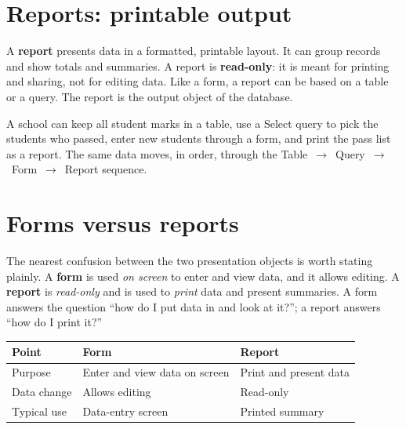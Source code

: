\section{Reports: printable output}
A \textbf{report} presents data in a formatted, printable layout. It can
group records and show totals and summaries. A report is \textbf{read-only}:
it is meant for printing and sharing, not for editing data. Like a form, a
report can be based on a table or a query. The report is the output object of
the database.

\begin{example}
A school can keep all student marks in a table, use a Select query to pick
the students who passed, enter new students through a form, and print the
pass list as a report. The same data moves, in order, through the
Table~$\rightarrow$~Query~$\rightarrow$~Form~$\rightarrow$~Report sequence.
\end{example}

\section{Forms versus reports}
The nearest confusion between the two presentation objects is worth stating
plainly. A \textbf{form} is used \emph{on screen} to enter and view data, and
it allows editing. A \textbf{report} is \emph{read-only} and is used to
\emph{print} data and present summaries. A form answers the question ``how do
I put data in and look at it?''; a report answers ``how do I print it?''

\begin{center}
\begin{tabular}{p{}p{}p{}}
\toprule
\textbf{Point} & \textbf{Form} & \textbf{Report} \\
\midrule
Purpose & Enter and view data on screen & Print and present data \\
Data change & Allows editing & Read-only \\
Typical use & Data-entry screen & Printed summary \\
\bottomrule
\end{tabular}
\end{center}


